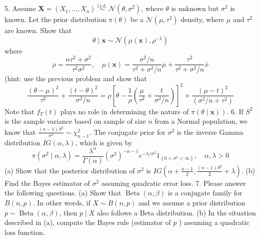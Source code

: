 5. Assume \(\mathbf{X}=\left(X_{1}, \ldots, X_{n}\right) \stackrel{\text { i.i.d. }}{\sim} \mathcal{N}\left(\theta, \sigma^{2}\right)\), where \(\theta\) is unknown but \(\sigma^{2}\) is known. Let the prior distribution \(\pi(\theta)\) be a \(\mathcal{N}\left(\mu, \tau^{2}\right)\) density, where \(\mu\) and \(\tau^{2}\) are known. Show that
\[
\theta \mid \mathbf{x} \sim \mathcal{N}\left(\mu(\mathbf{x}), \rho^{-1}\right)
\]
where
\[
\rho=\frac{n \tau^{2}+\sigma^{2}}{\tau^{2} \sigma^{2}}, \quad \mu(\mathbf{x})=\frac{\sigma^{2} / n}{\tau^{2}+\sigma^{2} / n} \mu+\frac{\tau^{2}}{\tau^{2}+\sigma^{2} / n} \bar{x}
\]
(hint: use the previous problem and show that
\[
\frac{(\theta-\mu)^{2}}{\tau^{2}}+\frac{(t-\theta)^{2}}{\sigma^{2} / n}=\rho\left[\theta-\frac{1}{\rho}\left(\frac{\mu}{\tau^{2}}+\frac{t}{\sigma^{2} / n}\right)\right]^{2}+\frac{(\mu-t)^{2}}{\left(\sigma^{2} / n+\tau^{2}\right)}
\]
Note that \(f_{T}(t)\) plays no role in determining the nature of \(\left.\pi(\theta \mid \mathbf{x})\right)\).
6. If \(S^{2}\) is the sample variance based on sample of size \(n\) from a Normal population, we know that \(\frac{(n-1) S^{2}}{\sigma^{2}} \sim \chi_{n-1}^{2}\). The conjugate prior for \(\sigma^{2}\) is the inverse Gamma distribution \(I G(\alpha, \lambda)\), which is given by
\[
\pi\left(\sigma^{2} \mid \alpha, \lambda\right)=\frac{\lambda^{\alpha}}{\Gamma(\alpha)}\left(\sigma^{2}\right)^{-\alpha-1} e^{-\lambda / \sigma^{2}} 1_{\left\{0<\sigma^{2}<\infty\right\}}, \quad \alpha, \lambda>0
\]
(a) Show that the posterior distribution of \(\sigma^{2}\) is \(I G\left(\alpha+\frac{n-1}{2}, \frac{(n-1) S^{2}}{2}+\lambda\right)\).
(b) Find the Bayes estimator of \(\sigma^{2}\) assuming quadratic error loss.
7. Please answer the following questions.
(a) Show that \(\operatorname{Beta}(\alpha, \beta)\) is a conjugate family for \(B(n, p)\). In other words, if \(X \sim B(n, p)\) and we assume a prior distribution \(p \sim \operatorname{Beta}(\alpha, \beta)\), then \(p \mid X\) also follows a Beta distribution.
(b) In the situation described in (a), compute the Bayes rule (estimator of \(p\) ) assuming a quadratic loss function.